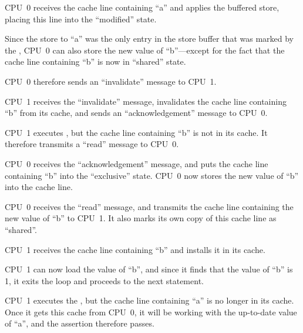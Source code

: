 \begin{sequence}
\item	CPU~0 receives the cache line containing ``a'' and applies
	the buffered store, placing this line into the ``modified''
	state.
\item	Since the store to ``a'' was the only
	entry in the store buffer that was marked by the ,
	CPU~0 can also store the new value of ``b''---except for the
	fact that the cache line containing ``b'' is now in ``shared''
	state.
\item	CPU~0 therefore sends an ``invalidate'' message to CPU~1.
\item	CPU~1 receives the ``invalidate'' message, invalidates the
	cache line containing ``b'' from its cache, and sends an
	``acknowledgement'' message to CPU~0.
\item	CPU~1 executes , but the cache line
	containing ``b'' is not in its cache.
	It therefore transmits a ``read'' message to CPU~0.
\item	CPU~0 receives the ``acknowledgement'' message, and puts
	the cache line containing ``b'' into the ``exclusive'' state.
	CPU~0 now stores the new value of ``b'' into the cache line.
\item	CPU~0 receives the ``read'' message, and transmits the
	cache line containing the new value of ``b''
	to CPU~1.
	It also marks its own copy of this cache line as ``shared''.%
	\label{seq:app:whymb:Store buffers: All copies shared}
\item	CPU~1 receives the cache line containing ``b'' and installs
	it in its cache.
\item	CPU~1 can now load the value of ``b'',
	and since it finds that the value of ``b'' is 1, it
	exits the  loop and proceeds
	to the next statement.
\item	CPU~1 executes the , but the cache line containing
	``a'' is no longer in its cache.
	Once it gets this cache from CPU~0, it will be
	working with the up-to-date value of ``a'', and the assertion
	therefore passes.
\end{sequence}

\QuickQuizEnd

